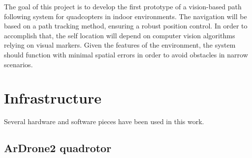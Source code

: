 \documentclass{styles/svproc}
\begin{document}
	
	The goal of this project is to develop the first prototype of a vision-based path following system for quadcopters in indoor environments. The navigation will be based on a path tracking method, ensuring a robust position control. In order to accomplish that, the self location will depend on computer vision algorithms relying on visual markers. Given the features of the environment, the system should function with minimal spatial errors in order to avoid obstacles in narrow scenarios.

\section{Infrastructure}

Several hardware and software pieces have been used in this work.

\subsection{ArDrone2 quadrotor}
\end{document}
